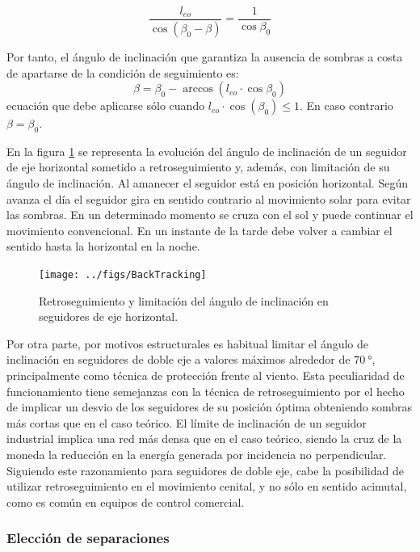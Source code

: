\begin{equation}
  \label{eq:BT_senos}
  \frac{l_{eo}}{\cos(\beta_0-\beta)}=\frac{1}{\cos{\beta_0}}
\end{equation}

Por tanto, el ángulo de inclinación que garantiza la ausencia de
sombras a costa de apartarse de la condición de seguimiento es:
\begin{equation}
  \label{eq:retroseguimiento}
  \beta=\beta_0-\arccos(l_{eo}\cdot\cos{\beta_0})  
\end{equation}
ecuación que debe aplicarse sólo cuando $l_{eo} \cdot
\cos(\beta_0) \leq 1$. En caso contrario $\beta = \beta_0$.

En la figura \ref{fig:Backtracking} se representa la evolución del
ángulo de inclinación de un seguidor de eje horizontal sometido a
retroseguimiento y, además, con limitación de su ángulo de
inclinación.  Al amanecer el seguidor está en posición
horizontal. Según avanza el día el seguidor gira en sentido
contrario al movimiento solar para evitar las sombras. En un
determinado momento se cruza con el sol y puede continuar el
movimiento convencional. En un instante de la tarde debe volver a
cambiar el sentido hasta la horizontal en la noche.  

\begin{figure}
  \centering
  \texttt{[image: ../figs/BackTracking]}
  \caption{Retroseguimiento y limitación del ángulo de inclinación
    en seguidores de eje horizontal.}
  \label{fig:Backtracking}
\end{figure}


Por otra parte, por motivos estructurales es habitual limitar 
el ángulo de inclinación en seguidores 
de doble eje a valores máximos alrededor de $\SI{70}{\degree}$, principalmente como
técnica de protección frente al viento. Esta peculiaridad de funcionamiento
tiene semejanzas con la técnica de retroseguimiento por el hecho de
implicar un desvio de los seguidores de su posición óptima obteniendo
sombras más cortas que en el caso teórico.  El límite de inclinación 
de un seguidor industrial implica una red más densa
que en el caso teórico, siendo la cruz de la moneda la reducción en
la energía generada por incidencia no perpendicular. 
Siguiendo este razonamiento para seguidores de doble eje, cabe la posibilidad de
utilizar retroseguimiento en el movimiento cenital, y no sólo en
sentido acimutal, como es común en equipos de control comercial.

\subsubsection{Elección de separaciones}
\label{sec:EleccionSeparaciones}

